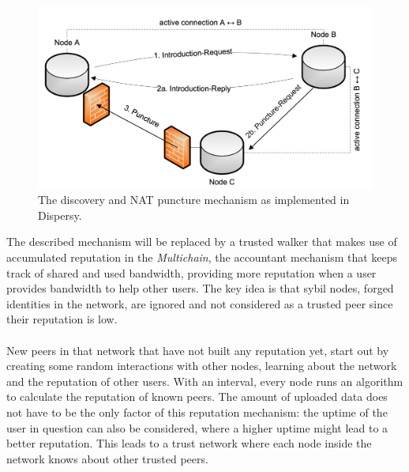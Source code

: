 \begin{figure}[h!]
	\centering
	\includegraphics[width=0.7\columnwidth]{images/architecture/dispersy_discover}
	\caption{The discovery and NAT puncture mechanism as implemented in Dispersy.}
	\label{fig:dispersy-discover}
\end{figure}

The described mechanism will be replaced by a trusted walker that makes use of accumulated reputation in the \emph{Multichain}, the accountant mechanism that keeps track of shared and used bandwidth, providing more reputation when a user provides bandwidth to help other users. The key idea is that sybil nodes, forged identities in the network, are ignored and not considered as a trusted peer since their reputation is low.\\\\
New peers in that network that have not built any reputation yet, start out by creating some random interactions with other nodes, learning about the network and the reputation of other users. With an interval, every node runs an algorithm to calculate the reputation of known peers. The amount of uploaded data does not have to be the only factor of this reputation mechanism: the uptime of the user in question can also be considered, where a higher uptime might lead to a better reputation. This leads to a trust network where each node inside the network knows about other trusted peers.

